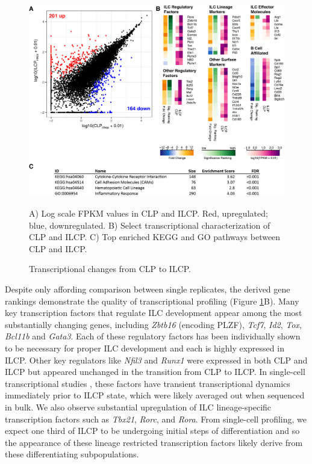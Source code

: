\begin{figure}[h]
\begin{center}
	\includegraphics[width=\textwidth]{figures/chapter4/Figure_1_transcription_profiles}
\end{center}
	\caption{Transcriptional changes from CLP to ILCP.} 
	A) Log scale FPKM values in CLP and ILCP. Red, upregulated; blue, downregulated. B) Select transcriptional characterization of CLP and ILCP. C) Top enriched KEGG and GO pathways between CLP and ILCP.
	\label{fig:chap4_tran}
\end{figure}

Despite only affording comparison between single replicates, the derived gene rankings demonstrate the quality of transcriptional profiling (Figure \ref{fig:chap4_tran}B). Many key transcription factors that regulate ILC development appear among the most substantially changing genes, including \textit{Zbtb16} (encoding PLZF), \textit{Tcf7}, \textit{Id2}, \textit{Tox}, \textit{Bcl11b} and \textit{Gata3}. Each of these regulatory factors has been individually shown to be necessary for proper ILC development and each is highly expressed in ILCP. Other key regulators like \textit{Nfil3} and \textit{Runx1} were expressed in both CLP and ILCP but appeared unchanged in the transition from CLP to ILCP. In single-cell transcriptional studies \cite{ishizuka2016}, these factors have transient transcriptional dynamics immediately prior to ILCP state, which were likely averaged out when sequenced in bulk. We also observe substantial upregulation of ILC lineage-specific transcription factors such as \textit{Tbx21}, \textit{Rorc}, and \textit{Rora}. From single-cell profiling, we expect one third of ILCP to be undergoing initial steps of differentiation and so the appearance of these lineage restricted transcription factors likely derive from these differentiating subpopulations.

